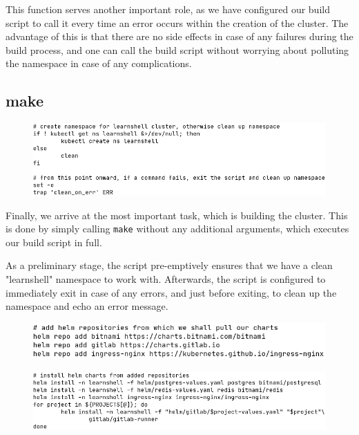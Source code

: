 \documentclass[thesis=B,english]{FITthesis}[2019/12/23]
\begin{document}
This function serves another important role, as we have configured our build script to call it every time an error occurs within the creation of the cluster. The advantage of this is that there are no side effects in case of any failures during the build process, and one can call the build script without worrying about polluting the namespace in case of any complications.

\subsection{make}

\begin{figure}[H]
\centering
\hspace*{-0.5cm}
\includegraphics[scale=0.5]{build-namespace}
\end{figure}

Finally, we arrive at the most important task, which is building the cluster. This is done by simply calling \verb|make| without any additional arguments, which executes our build script in full. 

As a preliminary stage, the script pre-emptively ensures that we have a clean "learnshell" namespace to work with. Afterwards, the script is configured to immediately exit in case of any errors, and just before exiting, to clean up the namespace and echo an error message.

\begin{figure}[H]
\centering
\hspace*{-1.5cm}
\includegraphics[scale=0.5]{build-helm1}
\end{figure}

\begin{figure}[H]
\centering
\hspace*{-0.5cm}
\includegraphics[scale=0.5]{build-helm2}
\end{figure}
\end{document}
